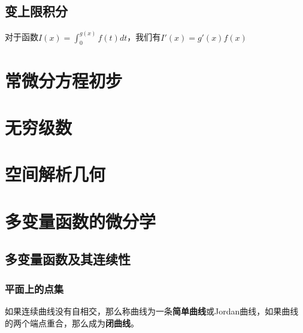 \documentclass[lang=cn,10pt]{elegantbook}
\begin{document}
\section{变上限积分}
\begin{theorem}
    对于函数$I(x)=\int_{0}^{g(x)}f(t)dt$，我们有$I'(x) = g'(x)f(x)$
\end{theorem}


\chapter{常微分方程初步}
\chapter{无穷级数}
\chapter{空间解析几何}
\chapter{多变量函数的微分学}
\section{多变量函数及其连续性}
\subsection{平面上的点集}
\begin{definition}[简单曲线]
    如果连续曲线没有自相交，那么称曲线为一条\textbf{简单曲线}或Jordan曲线，如果曲线的两个端点重合，那么成为\textbf{闭曲线}。
\end{definition}
\end{document}
